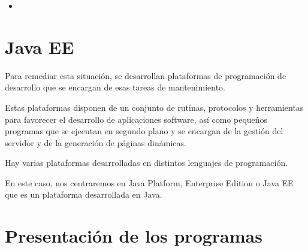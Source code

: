\documentclass[12pt, aspectratio=169]{beamer} %
\begin{document}
\begin{frame}
\begin{itemize}
			\item {}
			

		\end{itemize}

	\end{frame}

\section{Java EE}
	\begin{frame}
		Para remediar esta situación, se desarrollan plataformas de programación de desarrollo que
		se encargan de esas tareas de mantenimiento.
		
		Estas plataformas disponen de un conjunto de rutinas, protocolos y herramientas para favorecer
		el desarrollo de aplicaciones software, así como pequeños programas que se ejecutan en segundo
		plano y se encargan de la gestión del servidor y de la generación de páginas dinámicas.
		
		Hay varias plataformas desarrolladas en distintos lenguajes de programación.
		
		\pause
		
		\alert{En este caso, nos centraremos en Java Platform, Enterprise Edition o Java EE que es un plataforma
		desarrollada en Java.}
	\end{frame}

\section{Presentación de los programas}
\end{document}
